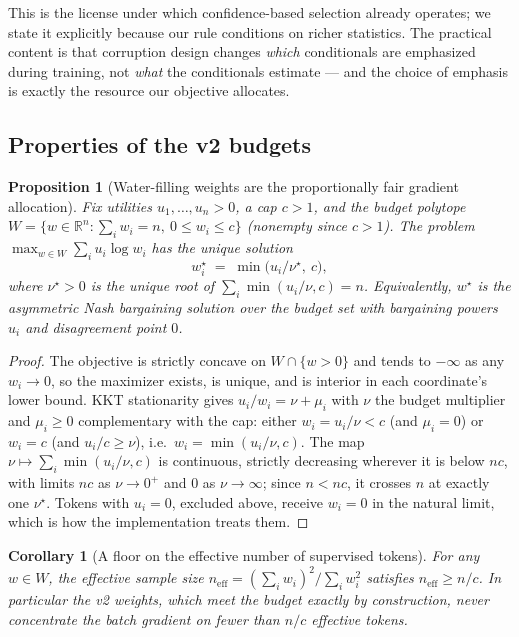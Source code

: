 \documentclass{article} %
\newtheorem{proposition}{Proposition}
\newtheorem{corollary}{Corollary}
\begin{document}
This is the license under which confidence-based selection \citep{lift2026} already operates; we state it explicitly because our rule conditions on richer statistics. The practical content is that corruption design changes \emph{which} conditionals are emphasized during training, not \emph{what} the conditionals estimate --- and the choice of emphasis is exactly the resource our objective allocates.

\subsection*{Properties of the v2 budgets}

\begin{proposition}[Water-filling weights are the proportionally fair gradient allocation]
\label{prop:waterfill}
Fix utilities $u_1, \dots, u_n > 0$, a cap $c > 1$, and the budget polytope $W = \{w \in \mathbb{R}^n : \sum_i w_i = n,\ 0 \le w_i \le c\}$ (nonempty since $c > 1$). The problem $\max_{w \in W} \sum_i u_i \log w_i$ has the unique solution
\[
w_i^\star \;=\; \min\!\big(u_i/\nu^\star,\ c\big),
\]
where $\nu^\star > 0$ is the unique root of $\sum_i \min(u_i/\nu, c) = n$. Equivalently, $w^\star$ is the asymmetric Nash bargaining solution over the budget set with bargaining powers $u_i$ and disagreement point $0$.
\end{proposition}

\begin{proof}
The objective is strictly concave on $W \cap \{w > 0\}$ and tends to $-\infty$ as any $w_i \to 0$, so the maximizer exists, is unique, and is interior in each coordinate's lower bound. KKT stationarity gives $u_i / w_i = \nu + \mu_i$ with $\nu$ the budget multiplier and $\mu_i \ge 0$ complementary with the cap: either $w_i = u_i/\nu < c$ (and $\mu_i = 0$) or $w_i = c$ (and $u_i/c \ge \nu$), i.e.\ $w_i = \min(u_i/\nu, c)$. The map $\nu \mapsto \sum_i \min(u_i/\nu, c)$ is continuous, strictly decreasing wherever it is below $nc$, with limits $nc$ as $\nu \to 0^+$ and $0$ as $\nu \to \infty$; since $n < nc$, it crosses $n$ at exactly one $\nu^\star$. Tokens with $u_i = 0$, excluded above, receive $w_i = 0$ in the natural limit, which is how the implementation treats them.
\end{proof}

\begin{corollary}[A floor on the effective number of supervised tokens]
\label{cor:ess}
For any $w \in W$, the effective sample size $n_{\mathrm{eff}} = (\sum_i w_i)^2 / \sum_i w_i^2$ satisfies $n_{\mathrm{eff}} \ge n / c$. In particular the v2 weights, which meet the budget exactly by construction, never concentrate the batch gradient on fewer than $n/c$ effective tokens.
\end{corollary}
\end{document}
